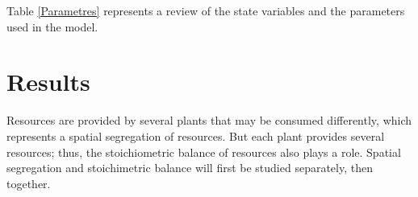 \documentclass[12pt]{article}
\begin{document}
Table \ref{Parametres} represents a review of the state variables and the parameters used in the model. %

\section*{Results}
Resources are provided by several plants that may be consumed differently, which represents a spatial segregation of resources. But each plant provides several resources; thus, the stoichiometric balance of resources also plays a role. %
Spatial segregation and stoichimetric balance will first be studied separately, then together. 
\end{document}
